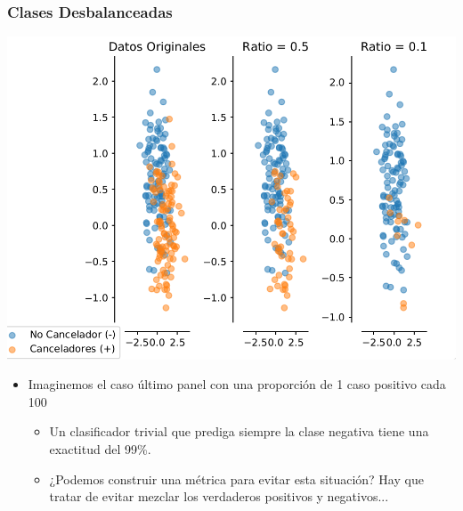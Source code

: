 \documentclass[leqno, 10pt, envcountsect]{beamer}
\numberwithin{equation}{section}
\theoremstyle{definition}
\theoremstyle{example}
\numberwithin{figure}{section}
\numberwithin{table}{section}
\let\olditem\item
\renewcommand{\item}{%
\olditem\vspace{1pt}}
\begin{document}
\begin{frame}[fragile=singleslide]
  \frametitle{Clases Desbalanceadas}
  \begin{center}
    \includegraphics[scale=0.2]{unbalance_class.png}
  \end{center}
  \begin{itemize}
    \item Imaginemos el caso último panel con una proporción de 1 caso
      positivo cada 100
      \begin{itemize}
        \item Un clasificador trivial que prediga siempre la clase negativa
          tiene una exactitud del 99\%.
        \item ¿Podemos construir una métrica para evitar esta situación? Hay
          que tratar de evitar mezclar los verdaderos positivos y negativos...
      \end{itemize}
  \end{itemize}
\end{frame}
\end{document}
